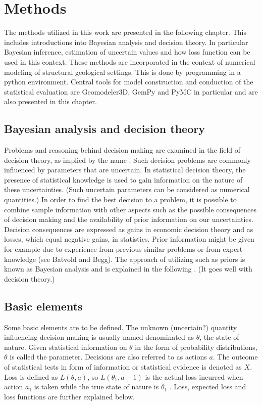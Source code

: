     \chapter{Methods}

    The methods utilized in this work are presented in the following chapter. This includes introductions into Bayesian analysis and decision theory. In particular Bayesian inference, estimation of uncertain values and how loss function can be used in this context. These methods are incorporated in the context of numerical modeling of structural geological settings. This is done by programming in a python environment. Central tools for model construction and conduction of the statistical evaluation are Geomodeler3D, GemPy and PyMC in particular and are also presented in this chapter.
    
        \section{Bayesian analysis and decision theory}
	    Problems and reasoning behind decision making are examined in the field of decision theory, as implied by the name \cite{berger2013stat}. Such decision problems are commonly influenced by parameters that are uncertain. In statistical decision theory, the presence of statistical knowledge is used to gain information on the nature of these uncertainties. (Such uncertain parameters can be considered as numerical quantities.) In order to find the best decision to a problem, it is possible to combine sample information with other aspects such as the possible consequences of decision making and the availability of prior information on our uncertainties. Decision consequences are expressed as gains in economic decision theory and as losses, which equal negative gains, in statistics. Prior information might be given for example due to experience from previous similar problems or from expert knowledge (see Batvold and Begg). The approach of utilizing such as priors is known as Bayesian analysis and is explained in the following \cite{berger2013stat}. (It goes well with decision theory.)
	    
	    \section{Basic elements}
	    Some basic elements are to be defined. The unknown (uncertain?) quantity influencing decision making is usually named denominated as $\theta$, the state of nature. Given statistical information on $\theta$ in the form of probability distributions, $\theta$ is called the parameter. 
	    Decisions are also referred to as actions $a$.
	    The outcome of statistical tests in form of information or statistical evidence is denoted as $X$.	    
	    Loss is defined as $L(\theta,a)$, so $L(\theta_1,a-1)$ is the actual loss incurred when action $a_1$ is taken while the true state of nature is $\theta_1$ \cite{berger2013stat}. Loss, expected loss and loss functions are further explained below.  
        
